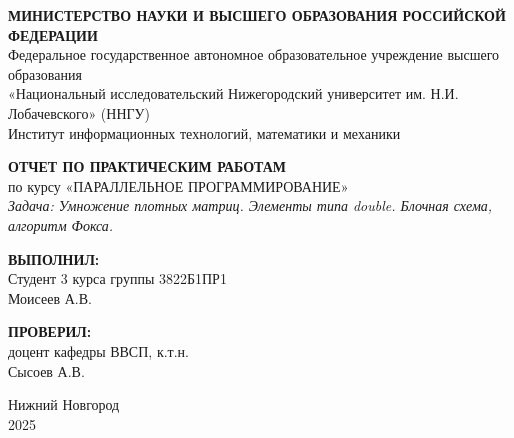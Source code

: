 \documentclass[14pt,a4paper]{extarticle}
\begin{document}
\begin{titlepage}
\begin{center}

\onehalfspacing

\begin{center}
    \textbf{МИНИСТЕРСТВО НАУКИ И ВЫСШЕГО ОБРАЗОВАНИЯ РОССИЙСКОЙ ФЕДЕРАЦИИ} \\
    Федеральное государственное автономное образовательное учреждение высшего образования \\
    «Национальный исследовательский Нижегородский университет им. Н.И. Лобачевского» (ННГУ) \\
    Институт информационных технологий, математики и механики
\end{center}

\vspace{4cm}

\begin{center}
    \textbf{ОТЧЕТ ПО ПРАКТИЧЕСКИМ РАБОТАМ} \vspace{0.5cm}\\
    по курсу «ПАРАЛЛЕЛЬНОЕ ПРОГРАММИРОВАНИЕ» \vspace{0.5cm}\\
    \textit{Задача: Умножение плотных матриц. Элементы типа double. Блочная схема, алгоритм Фокса.}
\end{center}

\vspace{4cm}

\begin{flushright}
    \textbf{ВЫПОЛНИЛ:} \\ 
    Студент 3 курса 
    группы 3822Б1ПР1 \\ 
    Моисеев А.В. \\

    \vspace{1cm}

    \textbf{ПРОВЕРИЛ:} \\ 
    доцент кафедры ВВСП, к.т.н. \\ 
    Сысоев А.В.
\end{flushright}

\begin{center}
    Нижний Новгород\\
    2025\newpage
\end{center}

\end{center}
\end{titlepage}

\tableofcontents
\newpage
\end{document}
